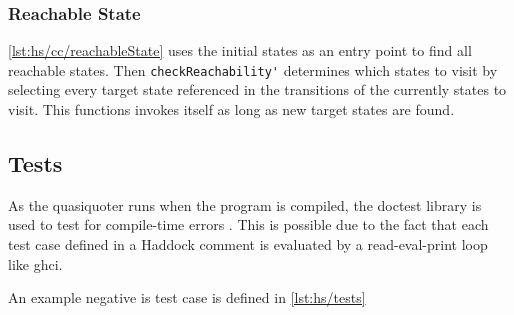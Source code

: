 

\subsubsection{Reachable State}

\autoref{lst:hs/cc/reachableState} uses the initial states as an entry point to find all reachable states.
Then \lstinline[language=haskell]{checkReachability'} determines which states to visit by selecting every target state referenced in the transitions of the currently states to visit.
This functions invokes itself as long as new target states are found.



\subsection{Tests}

As the quasiquoter runs when the program is compiled, the doctest library is used to test for compile-time errors \cite{doctest}.
This is possible due to the fact that each test case defined in a Haddock comment is evaluated by a read-eval-print loop like ghci.

An example negative is test case is defined in \autoref{lst:hs/tests}


